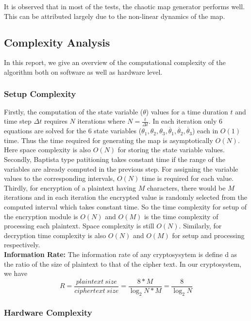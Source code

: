 It is observed that in most of the tests, the chaotic map generator performs well. This can be attributed largely due to the non-linear dynamics of the map.

\subsection{Complexity Analysis}

In this report, we give an overview of the computational complexity of the algorithm both on software as well as hardware level.

\subsubsection{Setup Complexity}
Firstly, the computation of the state variable (${\theta}$) values for a time duration $t$ and time step $\Delta t$ requires $N$ iterations where $N= \frac{t}{\Delta t}$. In each iteration only 6 equations are solved for the 6 state variables ($\theta_{1}, \theta_{2}, \theta_{3}, \dot{\theta_{1}}, \dot{\theta_{2}}, \dot{\theta_{3}}$) each in $O(1)$ time. Thus the time required for generating the map is asymptotically $O(N)$. Here space complexity is also $O(N)$ for storing the state variable values. Secondly, Baptista type patitioning takes constant time if the range of the variables are already computed in the previous step. For assigning the variable values to the corresponding intervals, $O(N)$ time is required for each value. Thirdly, for encryption of a plaintext having $M$ characters, there would be $M$ iterations and in each iteration the encrypted value is randomly selected from the computed interval which takes constant time. So the time complexity for setup of the encryption module is $O(N)$ and $O(M)$ is the time complexity of processing each plaintext. Space complexity is still $O(N)$. Similarly, for decryption time complexity is also $O(N)$ and $O(M)$ for setup and processing respectively.\\
\textbf{Information Rate:} The information rate of any cryptosysytem is define d as the ratio of the size of plaintext to that of the cipher text. In our cryptosystem, we have
\begin{equation}
R = \frac{plaintext\ size}{ciphertext\ size} = \frac{8*M}{\log_2N*M} = \frac{8}{\log_2N}
\end{equation}
\subsubsection{Hardware Complexity}
